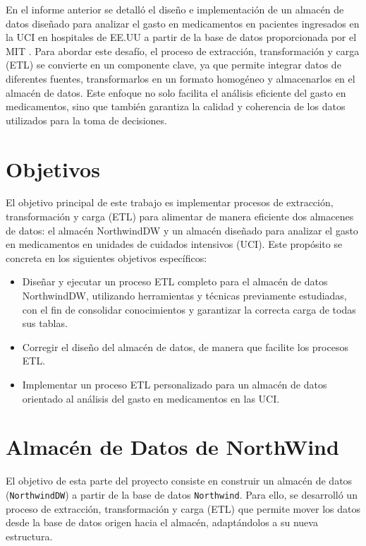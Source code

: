 \documentclass{article}
\begin{document}
En el informe anterior se detalló el diseño e implementación de un almacén de datos diseñado para analizar el gasto en medicamentos en pacientes ingresados en la UCI en hospitales de EE.UU a partir de la base de datos proporcionada por el MIT \cite{eicu_crd}. Para abordar este desafío, el proceso de extracción, transformación y carga (ETL) se convierte en un componente clave, ya que permite integrar datos de diferentes fuentes, transformarlos en un formato homogéneo y almacenarlos en el almacén de datos. Este enfoque no solo facilita el análisis eficiente del gasto en medicamentos, sino que también garantiza la calidad y coherencia de los datos utilizados para la toma de decisiones.

\section{Objetivos}
\label{sec:objetivos}

El objetivo principal de este trabajo es implementar procesos de extracción, transformación y carga (ETL) para alimentar de manera eficiente dos almacenes de datos: el almacén NorthwindDW y un almacén diseñado para analizar el gasto en medicamentos en unidades de cuidados intensivos (UCI). Este propósito se concreta en los siguientes objetivos específicos:

\begin{itemize}
	\item Diseñar y ejecutar un proceso ETL completo para el almacén de datos NorthwindDW, utilizando herramientas y técnicas previamente estudiadas, con el fin de consolidar conocimientos y garantizar la correcta carga de todas sus tablas.
	\item Corregir el diseño del almacén de datos, de manera que facilite los procesos ETL.
	\item Implementar un proceso ETL personalizado para un almacén de datos orientado al análisis del gasto en medicamentos en las UCI.
	
\end{itemize}

\section{Almacén de Datos de NorthWind}

 El objetivo de esta parte del proyecto consiste en construir un almacén de datos (\texttt{NorthwindDW}) a partir de la base de datos \texttt{Northwind}. Para ello, se desarrolló un proceso de extracción, transformación y carga (ETL) que permite mover los datos desde la base de datos origen hacia el almacén, adaptándolos a su nueva estructura.
\end{document}

